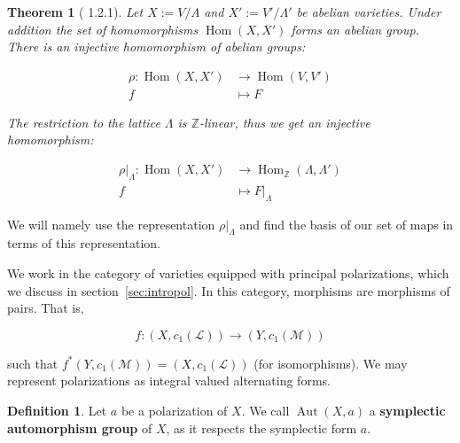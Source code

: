 \documentclass[12pt,reqno]{amsart}
\DeclareMathOperator{\Aut}{Aut}
\DeclareMathOperator{\Hom}{Hom}
\newcommand{\Z}{\mathbb{Z}}
\newcommand{\mc}{\mathcal}
\newtheorem*{thm*}{Theorem}
\theoremstyle{definition}
\newtheorem{defn}{Definition}
\theoremstyle{remark}
\begin{document}



\begin{thm*}[\cite{bl} 1.2.1] Let $X:= V/\Lambda$ and $X':= V'/\Lambda'$ be abelian varieties. Under addition the set of homomorphisms $\Hom(X, X')$ forms an abelian group. There is an injective homomorphism of abelian groups: 


\begin{align*} 
\rho: \Hom(X, X') &\to \Hom(V, V') \\
f &\mapsto F
\end{align*} 

The restriction to the lattice $\Lambda$ is $\Z$-linear, thus we get an injective homomorphism: 


\begin{align*} 
\rho|_{\Lambda}: \Hom(X, X') &\to \Hom_{\Z}(\Lambda, \Lambda') \\
f &\mapsto F|_{\Lambda}
\end{align*} 


\end{thm*}

We will namely use the representation $\rho|_{\Lambda}$ and find the basis of our set of maps in terms of this representation. 

We work in the category of varieties equipped with principal polarizations, which we discuss in section~\ref{sec:intropol}. In this category, morphisms are morphisms of pairs. That is,

$$f: (X, c_1(\mc{L})) \to (Y, c_1(\mc{M}))$$

such that $f^*(Y, c_1(\mc{M})) = (X, c_1(\mc{L}))$ (for isomorphisms).  We may represent polarizations as integral valued alternating forms. 



\begin{defn} Let $a$ be a polarization of $X$. We call $\Aut(X, a)$ a \textbf{symplectic automorphism group} of $X$, as it respects the symplectic form $a$. 
\end{defn}

\end{document}

